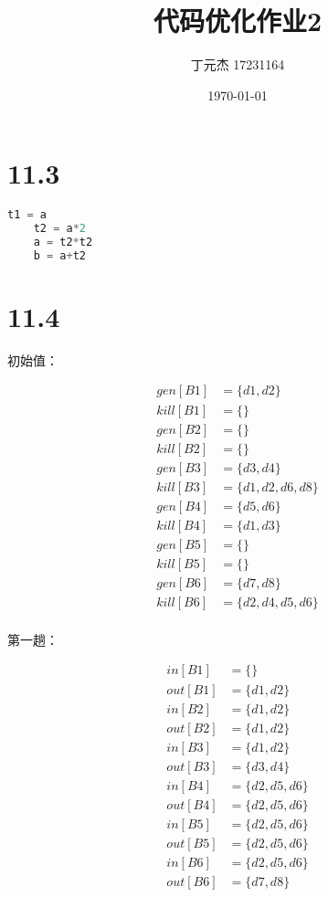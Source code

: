 \documentclass[UTF8]{ctexart}
\title{代码优化作业2}
\author{丁元杰 17231164}
\date{\today}
\begin{document}
\maketitle

\section*{11.3}

\begin{lstlisting}[language=C]
    t1 = a
    t2 = a*2
    a = t2*t2
    b = a+t2
\end{lstlisting}

\section*{11.4}

初始值：

\begin{align*}
    gen[B1] &= \{d1, d2\}\\
    kill[B1] &= \{\} \\
    gen[B2] &= \{\} \\
    kill[B2] &= \{\} \\
    gen[B3] &= \{d3, d4\} \\
    kill[B3] &= \{d1, d2, d6, d8\} \\
    gen[B4] &= \{d5, d6\} \\
    kill[B4] &= \{d1, d3\} \\
    gen[B5] &= \{\} \\
    kill[B5] &= \{\} \\
    gen[B6] &= \{d7, d8\} \\
    kill[B6] &= \{d2, d4, d5, d6\} \\
\end{align*}

第一趟：

\begin{align*}
    in[B1] &= \{\} \\
    out[B1] &= \{d1, d2\} \\
    in[B2] &= \{d1, d2\} \\
    out[B2] &= \{d1, d2\} \\
    in[B3] &= \{d1, d2\} \\
    out[B3] &= \{d3, d4\} \\
    in[B4] &= \{d2, d5, d6\} \\
    out[B4] &= \{d2, d5, d6\} \\
    in[B5] &= \{d2, d5, d6\} \\
    out[B5] &= \{d2, d5, d6\} \\
    in[B6] &= \{d2, d5, d6\} \\
    out[B6] &= \{d7, d8\} \\
\end{align*}
\end{document}
